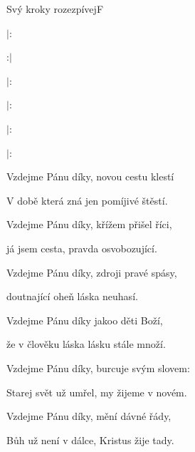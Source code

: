 \clearpage
\setcounter{page}{118}
\begin{song}{Svý kroky rozezpívej}{F}{}

\begin{SBChorus}

$|$: 

 :$|$

\end{SBChorus}

\begin{SBVerse}

$|$: 

$|$: 

$|$: 

$|$: 

\end{SBVerse}

\begin{SBVerse}

Vzdejme Pánu díky, novou cestu klestí

V době která zná jen pomíjivé štěstí.

Vzdejme Pánu díky, křížem přišel říci,

já jsem cesta, pravda osvobozující.

\end{SBVerse}

\begin{SBVerse}

Vzdejme Pánu díky, zdroji pravé spásy,

doutnající oheň láska neuhasí.

Vzdejme Pánu díky jakoo děti Boží,

že v člověku láska lásku stále množí.

\end{SBVerse}

\begin{SBVerse}

Vzdejme Pánu díky, burcuje svým slovem:

Starej svět už umřel, my žijeme v novém.

Vzdejme Pánu díky, mění dávné řády,

Bůh už není v dálce, Kristus žije tady.

\end{SBVerse}

\end{song}
